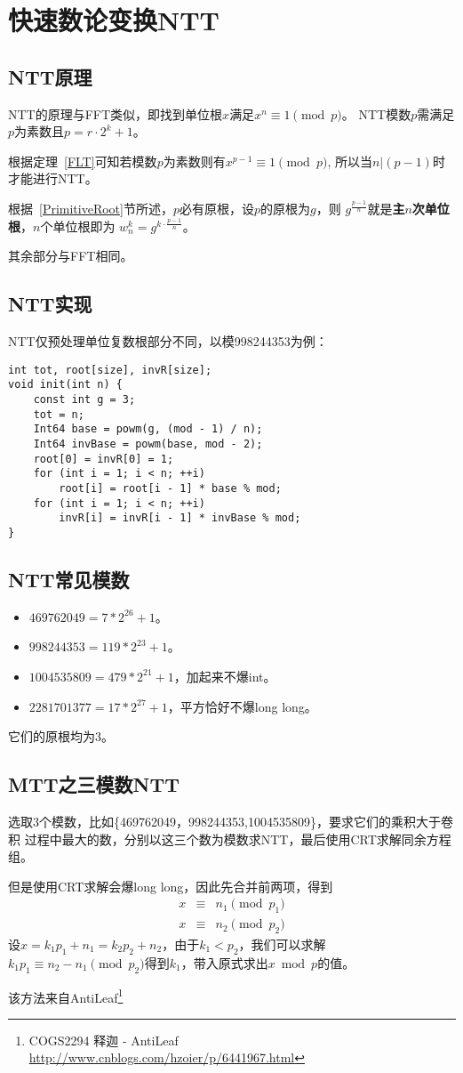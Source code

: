 \section{快速数论变换NTT}
\subsection{NTT原理}
NTT的原理与FFT类似，即找到单位根$x$满足$x^n\equiv 1 \pmod{p}$。
NTT模数$p$需满足$p$为素数且$p=r\cdot 2^k+1$。

根据定理~\ref{FLT}可知若模数$p$为素数则有$x^{p-1}\equiv 1 \pmod{p}$,
所以当$n|(p-1)$时才能进行NTT。

根据~\ref{PrimitiveRoot}节所述，$p$必有原根，设$p$的原根为$g$，则
$g^\frac{p-1}{n}$就是{\bfseries 主$n$次单位根}，$n$个单位根即为
$w_n^k=g^{k\cdot \frac{p-1}{n}}$。

其余部分与FFT相同。

\subsection{NTT实现}
NTT仅预处理单位复数根部分不同，以模998244353为例：
\begin{lstlisting}
int tot, root[size], invR[size];
void init(int n) {
    const int g = 3;
    tot = n;
    Int64 base = powm(g, (mod - 1) / n);
    Int64 invBase = powm(base, mod - 2);
    root[0] = invR[0] = 1;
    for (int i = 1; i < n; ++i)
        root[i] = root[i - 1] * base % mod;
    for (int i = 1; i < n; ++i)
        invR[i] = invR[i - 1] * invBase % mod;
}
\end{lstlisting}
\subsection{NTT常见模数}
\begin{itemize}
    \item $469762049=7*2^{26}+1$。
    \item $998244353=119*2^{23}+1$。
    \item $1004535809=479*2^{21}+1$，加起来不爆int。
    \item $2281701377=17*2^{27}+1$，平方恰好不爆long long。
\end{itemize}
它们的原根均为3。
\subsection{MTT之三模数NTT}
选取3个模数，比如\{469762049，998244353,1004535809\}，要求它们的乘积大于卷积
过程中最大的数，分别以这三个数为模数求NTT，最后使用CRT求解同余方程组。

但是使用CRT求解会爆long long，因此先合并前两项，得到
\begin{eqnarray*}
    x&\equiv&n_1 \pmod{p_1}\\
    x&\equiv&n_2 \pmod{p_2}
\end{eqnarray*}
设$x=k_1p_1+n_1=k_2p_2+n_2$，由于$k_1<p_2$，我们可以求解
$k_1p_1\equiv n_2-n_1 \pmod{p_2}$得到$k_1$，带入原式求出$x \bmod{p}$的值。

该方法来自AntiLeaf\footnote{COGS2294 释迦 - AntiLeaf
\url{http://www.cnblogs.com/hzoier/p/6441967.html}}
